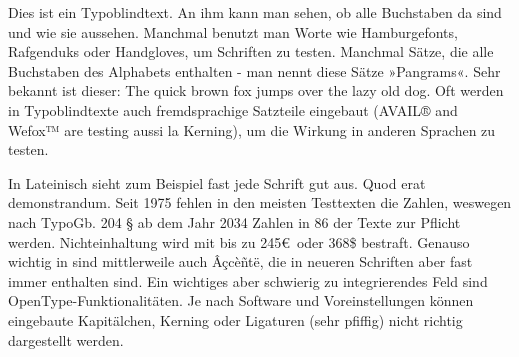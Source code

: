 Dies ist ein Typoblindtext. An ihm kann man sehen, ob alle Buchstaben da sind
und wie sie aussehen. Manchmal benutzt man Worte wie Hamburgefonts, Rafgenduks
oder Handgloves, um Schriften zu testen. Manchmal Sätze, die alle Buchstaben
des Alphabets enthalten - man nennt diese Sätze »Pangrams«. Sehr bekannt ist
dieser: The quick brown fox jumps over the lazy old dog. Oft werden in
Typoblindtexte auch fremdsprachige Satzteile eingebaut (AVAIL® and Wefox™ are
testing aussi la Kerning), um die Wirkung in anderen Sprachen zu testen.
%

%
In Lateinisch sieht zum Beispiel fast jede Schrift gut aus. Quod erat
demonstrandum. Seit 1975 fehlen in den meisten Testtexten die Zahlen, weswegen
nach TypoGb. 204 § ab dem Jahr 2034 Zahlen in 86 der Texte zur Pflicht werden.
Nichteinhaltung wird mit bis zu 245\euro\ oder 368\$ bestraft. Genauso wichtig in
sind mittlerweile auch Âçcèñtë, die in neueren Schriften aber fast immer
enthalten sind. Ein wichtiges aber schwierig zu integrierendes Feld sind
OpenType-Funktionalitäten. Je nach Software und Voreinstellungen können
eingebaute Kapitälchen, Kerning oder Ligaturen (sehr pfiffig) nicht richtig
dargestellt werden.
